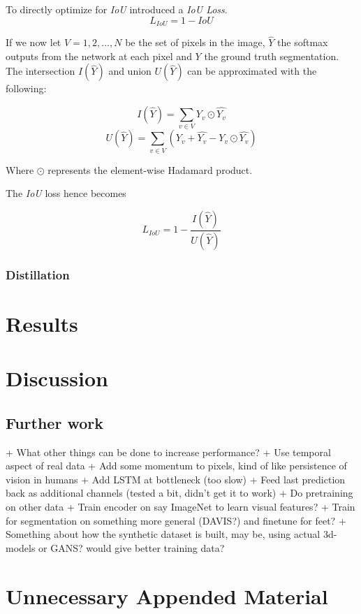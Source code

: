 \documentclass{kththesis}
\begin{document}
To directly optimize for \textit{IoU} \textcite{rahman2016optimizing} introduced
a \textit{IoU Loss}.
\[L_{IoU} = 1 - \textit{IoU}\]

If we now let \(V = {1, 2, \dots, N}\) be the set of pixels in the image, \(\hat{Y}\)
the softmax outputs from the network at each pixel and \(Y\) the ground truth
segmentation. The intersection \(I(\hat{Y})\) and union \(U(\hat{Y})\) can be
approximated with the following:

\[I(\hat{Y}) = \sum_{v \in V} Y_v \odot \hat{Y_v}\]
\[U(\hat{Y}) = \sum_{v \in V}\left( Y_v + \hat{Y_v} - Y_v \odot \hat{Y_v} \right) \]

Where \(\odot\) represents the element-wise Hadamard product.

The \textit{IoU} loss hence becomes

\[L_{\textit{IoU}} = 1 - \frac{I(\hat{Y})}{U(\hat{Y})}\]


\subsection{Distillation}

\chapter{Results}

\chapter{Discussion}

\section{Further work}
+ What other things can be done to increase performance?
  + Use temporal aspect of real data
    + Add some momentum to pixels, kind of like persistence of vision in humans 
    + Add LSTM at bottleneck (too slow)
    + Feed last prediction back as additional channels (tested a bit, didn't get it to work)
  + Do pretraining on other data
    + Train encoder on say ImageNet to learn visual features?
    + Train for segmentation on something more general (DAVIS?) and finetune for feet?
    + Something about how the synthetic dataset is built, may be, using actual
    3d-models or GANS? would give better training data?
    

\printbibliography[heading=bibintoc] %

\appendix

\chapter{Unnecessary Appended Material}
\end{document}
